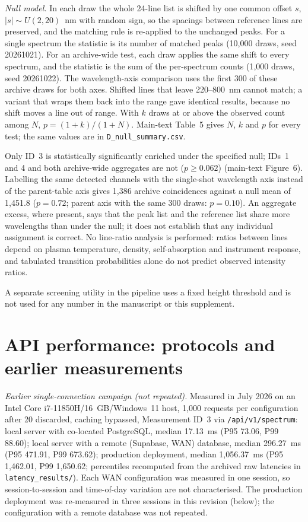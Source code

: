 \documentclass[10pt,a4paper]{article}
\begin{document}
\textit{Null model.} In each draw the whole 24-line list is shifted by one common offset $s$, $|s|\sim U(2,20)$~nm with random sign, so the spacings between reference lines are preserved, and the matching rule is re-applied to the unchanged peaks. For a single spectrum the statistic is its number of matched peaks (10,000 draws, seed 20261021). For an archive-wide test, each draw applies the same shift to every spectrum, and the statistic is the sum of the per-spectrum counts (1,000 draws, seed 20261022). The wavelength-axis comparison uses the first 300 of these archive draws for both axes. Shifted lines that leave 220--800~nm cannot match; a variant that wraps them back into the range gave identical results, because no shift moves a line out of range. With $k$ draws at or above the observed count among $N$, $p=(1+k)/(1+N)$. Main-text Table~5 gives $N$, $k$ and $p$ for every test; the same values are in \texttt{D\_null\_summary.csv}.

Only ID~3 is statistically significantly enriched under the specified null; IDs~1 and 4 and both archive-wide aggregates are not ($p\ge0.062$) (main-text Figure~6). Labelling the same detected channels with the single-shot wavelength axis instead of the parent-table axis gives 1,386 archive coincidences against a null mean of 1,451.8 ($p=0.72$; parent axis with the same 300 draws: $p=0.10$). An aggregate excess, where present, says that the peak list and the reference list share more wavelengths than under the null; it does not establish that any individual assignment is correct. No line-ratio analysis is performed: ratios between lines depend on plasma temperature, density, self-absorption and instrument response, and tabulated transition probabilities alone do not predict observed intensity ratios.

A separate screening utility in the pipeline uses a fixed height threshold and is not used for any number in the manuscript or this supplement.

\section{API performance: protocols and earlier measurements}

\textit{Earlier single-connection campaign (not repeated).} Measured in July 2026 on an Intel Core i7-11850H/16~GB/Windows~11 host, 1,000 requests per configuration after 20 discarded, caching bypassed, Measurement ID~3 via \texttt{/api/v1/spectrum}: local server with co-located PostgreSQL, median 17.13~ms (P95 73.06, P99 88.60); local server with a remote (Supabase, WAN) database, median 296.27~ms (P95 471.91, P99 673.62); production deployment, median 1,056.37~ms (P95 1,462.01, P99 1,650.62; percentiles recomputed from the archived raw latencies in \texttt{latency\_results/}). Each WAN configuration was measured in one session, so session-to-session and time-of-day variation are not characterised. The production deployment was re-measured in three sessions in this revision (below); the configuration with a remote database was not repeated.
\end{document}
